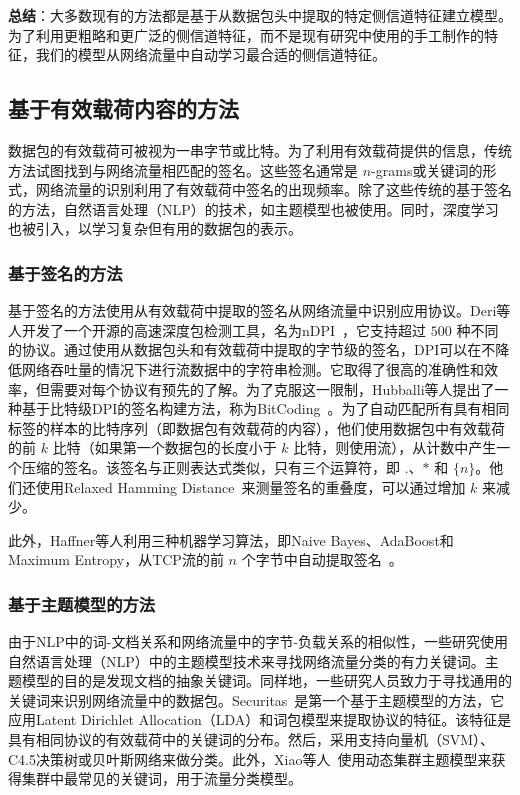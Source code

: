 \documentclass[degree=master,cjk-font=noto]{thuthesis}
\begin{document}
\textbf{总结}：大多数现有的方法都是基于从数据包头中提取的特定侧信道特征建立模型。为了利用更粗略和更广泛的侧信道特征，而不是现有研究中使用的手工制作的特征，我们的模型从网络流量中自动学习最合适的侧信道特征。

\subsection{基于有效载荷内容的方法}

数据包的有效载荷可被视为一串字节或比特。为了利用有效载荷提供的信息，传统方法试图找到与网络流量相匹配的签名。这些签名通常是 $n$-grams或关键词的形式，网络流量的识别利用了有效载荷中签名的出现频率。除了这些传统的基于签名的方法，自然语言处理（NLP）的技术，如主题模型也被使用。同时，深度学习也被引入，以学习复杂但有用的数据包的表示。

\subsubsection{基于签名的方法}

基于签名的方法使用从有效载荷中提取的签名从网络流量中识别应用协议。Deri等人开发了一个开源的高速深度包检测工具，名为nDPI~\cite{b24}，它支持超过 $500$ 种不同的协议。通过使用从数据包头和有效载荷中提取的字节级的签名，DPI可以在不降低网络吞吐量的情况下进行流数据中的字符串检测。它取得了很高的准确性和效率，但需要对每个协议有预先的了解。为了克服这一限制，Hubballi等人提出了一种基于比特级DPI的签名构建方法，称为BitCoding~\cite{bitcoding}。为了自动匹配所有具有相同标签的样本的比特序列（即数据包有效载荷的内容），他们使用数据包中有效载荷的前 $k$ 比特（如果第一个数据包的长度小于 $k$ 比特，则使用流），从计数中产生一个压缩的签名。该签名与正则表达式类似，只有三个运算符，即 $.$、$*$ 和 $\{n\}$。他们还使用Relaxed Hamming Distance~\cite{bitcoding}来测量签名的重叠度，可以通过增加 $k$ 来减少。

此外，Haffner等人利用三种机器学习算法，即Naive Bayes、AdaBoost和Maximum Entropy，从TCP流的前 $n$ 个字节中自动提取签名~\cite{b19}。

\subsubsection{基于主题模型的方法}

由于NLP中的词-文档关系和网络流量中的字节-负载关系的相似性，一些研究使用自然语言处理（NLP）中的主题模型技术来寻找网络流量分类的有力关键词。主题模型的目的是发现文档的抽象关键词。同样地，一些研究人员致力于寻找通用的关键词来识别网络流量中的数据包。Securitas~\cite{b25}是第一个基于主题模型的方法，它应用Latent Dirichlet Allocation（LDA）和词包模型来提取协议的特征。该特征是具有相同协议的有效载荷中的关键词的分布。然后，采用支持向量机（SVM）、C4.5决策树或贝叶斯网络来做分类。此外，Xiao等人~\cite{DMTCS}使用动态集群主题模型来获得集群中最常见的关键词，用于流量分类模型。
\end{document}
